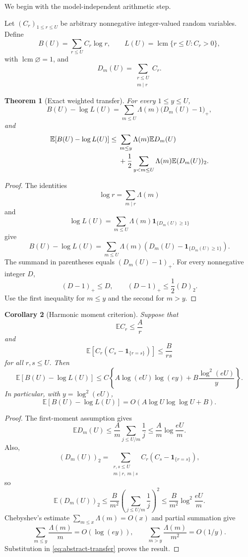 \documentclass[11pt]{article}
\newtheorem{theorem}{Theorem}[section]
\newtheorem{corollary}[theorem]{Corollary}
\theoremstyle{definition}
\theoremstyle{remark}
\newcommand{\Ee}{\mathbb E}
\newcommand{\one}{\mathbf 1}
\newcommand{\lcm}{\operatorname{lcm}}
\begin{document}
We begin with the model-independent arithmetic step.

Let $(C_r)_{1\le r\le U}$ be arbitrary nonnegative integer-valued random
variables.  Define
\[
 B(U)=\sum_{r\le U}C_r\log r,
 \qquad
 L(U)=\lcm\{r\le U:C_r>0\},
\]
with $\lcm\varnothing=1$, and
\[
 D_m(U)=\sum_{\substack{r\le U\\m\mid r}}C_r.
\]

\begin{theorem}[Exact weighted transfer]\label{thm:abstract-transfer}
For every $1\le y\le U$,
\[
 B(U)-\log L(U)
 =
 \sum_{m\le U}\Lambda(m)\bigl(D_m(U)-1\bigr)_+,
\]
and
\begin{align}
 \Ee[B(U)-\log L(U)]
 \le{}&
 \sum_{m\le y}\Lambda(m)\Ee D_m(U)
 \notag\\
 &+\frac12\sum_{y<m\le U}\Lambda(m)\Ee(D_m(U))_2.
 \label{eq:abstract-transfer}
\end{align}
\end{theorem}

\begin{proof}
The identities
\[
 \log r=\sum_{m\mid r}\Lambda(m)
\]
and
\[
 \log L(U)=\sum_{m\le U}\Lambda(m)\one_{\{D_m(U)\ge1\}}
\]
give
\[
 B(U)-\log L(U)
 =
 \sum_{m\le U}\Lambda(m)
 \left(D_m(U)-\one_{\{D_m(U)\ge1\}}\right).
\]
The summand in parentheses equals $(D_m(U)-1)_+$.  For every nonnegative
integer $D$,
\[
 (D-1)_+\le D,
 \qquad
 (D-1)_+\le\frac12(D)_2.
\]
Use the first inequality for $m\le y$ and the second for $m>y$.
\end{proof}

\begin{corollary}[Harmonic moment criterion]\label{cor:harmonic-transfer}
Suppose that
\[
 \Ee C_r\le\frac{A}{r}
\]
and
\[
 \Ee\!\left[C_r(C_s-\one_{\{r=s\}})\right]\le\frac{B}{rs}
\]
for all $r,s\le U$.  Then
\[
 \Ee[B(U)-\log L(U)]
 \le
 C\left\{
 A\log(eU)\log(ey)
 +B\frac{\log^2(eU)}{y}
 \right\}.
\]
In particular, with $y=\log^2(eU)$,
\[
 \Ee[B(U)-\log L(U)]
 =
 O\!\left(A\log U\log\log U+B\right).
\]
\end{corollary}

\begin{proof}
The first-moment assumption gives
\[
 \Ee D_m(U)
 \le\frac{A}{m}\sum_{j\le U/m}\frac1j
 \le\frac{A}{m}\log\frac{eU}{m}.
\]
Also,
\[
 (D_m(U))_2
 =
 \sum_{\substack{r,s\le U\\m\mid r,\ m\mid s}}
 C_r(C_s-\one_{\{r=s\}}),
\]
so
\[
 \Ee(D_m(U))_2
 \le
 \frac{B}{m^2}
 \left(\sum_{j\le U/m}\frac1j\right)^2
 \le
 \frac{B}{m^2}\log^2\frac{eU}{m}.
\]
Chebyshev's estimate $\sum_{m\le x}\Lambda(m)=O(x)$ and partial summation
give
\[
 \sum_{m\le y}\frac{\Lambda(m)}m=O(\log(ey)),
 \qquad
 \sum_{m>y}\frac{\Lambda(m)}{m^2}=O(1/y).
\]
Substitution in \eqref{eq:abstract-transfer} proves the result.
\end{proof}
\end{document}
